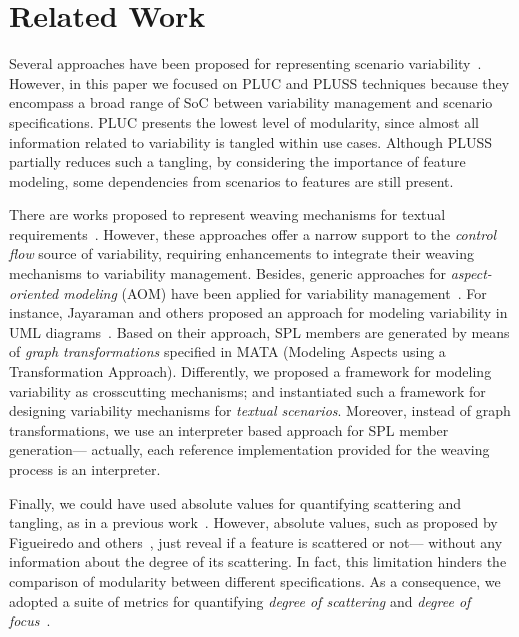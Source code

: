 \section{Related Work}
\label{sec:related}

Several approaches have been proposed for representing
scenario variability~\cite{Jacobson:1997aa,Eriksson:2005aa,Bertolino:2003aa}. However, in this paper
we focused on PLUC and
PLUSS techniques because they encompass a broad range
of SoC between variability management and scenario specifications.
PLUC presents the lowest level of modularity, since
almost all information related to variability is tangled within
use cases. Although PLUSS partially reduces such a tangling,
by considering the importance of feature modeling, some
dependencies from scenarios to features are still present.

There are works proposed to
represent weaving mechanisms for textual
requirements~\cite{Chitchyan:2007aa,Sillito:2004aa}. However, these approaches offer a narrow support to the \emph{control flow} source of variability, requiring enhancements to integrate their weaving mechanisms to variability management. Besides, generic 
approaches for \emph{aspect-oriented modeling} (AOM) have been applied for 
variability management~\cite{Jayaraman:2007aa,Morin:2008aa,Groher:2008aa}. For instance, Jayaraman and others proposed an approach for modeling variability in UML diagrams~\cite{Jayaraman:2007aa}. Based on their approach, SPL members are generated by means of \emph{graph transformations} specified in MATA (Modeling Aspects using a Transformation Approach). Differently, we proposed a framework for modeling variability as crosscutting mechanisms; and instantiated such a framework for designing variability mechanisms for \emph{textual scenarios}. Moreover, instead of graph transformations, we use an interpreter based approach for SPL member generation--- actually, each reference implementation provided for the weaving process is an interpreter.


Finally, we could have used absolute values for quantifying scattering and tangling, as
 in a previous work~\cite{Bonifacio:2008aa}. However, absolute values, such as proposed by Figueiredo and others~\cite{Figueiredo:2008aa}, just reveal if a feature is scattered or not--- without any information about the degree of its scattering. In fact, this limitation hinders the comparison of modularity between different specifications.
As a consequence, we adopted a suite of metrics for quantifying
\emph{degree of scattering} and \emph{degree of focus}~\cite{Eaddy:2007aa}.



